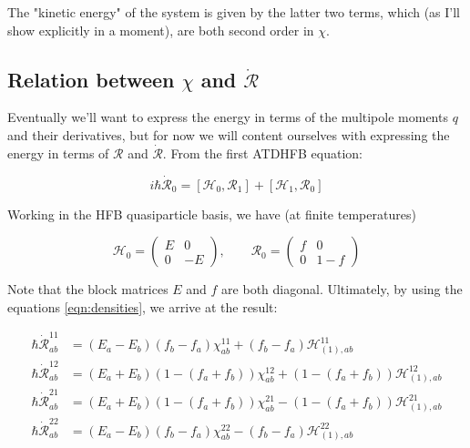 \noindent The "kinetic energy" of the system is given by the latter two terms, which (as I'll show explicitly in a moment), are both second order in $\chi$.

\subsection{Relation between $\chi$ and $\dot{\mathcal{R}}$}\label{sect:chi-rdot}

Eventually we'll want to express the energy in terms of the multipole moments $q$ and their derivatives, but for now we will content ourselves with expressing the energy in terms of $\mathcal{R}$ and $\dot{\mathcal{R}}$. From the first ATDHFB equation:

\begin{equation*}
i\hbar\mathcal{\dot{R}}_0 = \left[\mathcal{H}_0, \mathcal{R}_1\right] + \left[\mathcal{H}_1, \mathcal{R}_0\right]
\end{equation*}

Working in the HFB quasiparticle basis, we have (at finite temperatures)

\begin{equation*}
\mathcal{H}_0 = 
\left(\begin{array}{cc}
E & 0 \\
0 & -E
\end{array}\right), 
\qquad \mathcal{R}_0 = 
\left(\begin{array}{cc}
f & 0 \\
0 & 1-f
\end{array}\right)
\end{equation*}

\noindent Note that the block matrices $E$ and $f$ are both diagonal. Ultimately, by using the equations \ref{eqn:densities}, we arrive at the result:

\begin{align*}
\hbar \dot{\mathcal{R}}_{ab}^{11} &= (E_a-E_b)(f_b-f_a)\chi_{ab}^{11} + (f_b-f_a)\mathcal{H}^{11}_{(1),ab} \\
\hbar \dot{\mathcal{R}}_{ab}^{12} &= (E_a+E_b)\left(1-(f_a+f_b)\right)\chi_{ab}^{12} + \left(1-(f_a+f_b)\right)\mathcal{H}^{12}_{(1),ab} \\
\hbar \dot{\mathcal{R}}_{ab}^{21} &= (E_a+E_b)\left(1-(f_a+f_b)\right)\chi_{ab}^{21} - \left(1-(f_a+f_b)\right)\mathcal{H}^{21}_{(1),ab} \\
\hbar \dot{\mathcal{R}}_{ab}^{22} &= (E_a-E_b)(f_b-f_a)\chi_{ab}^{22} - (f_b-f_a)\mathcal{H}^{22}_{(1),ab}
\end{align*}

